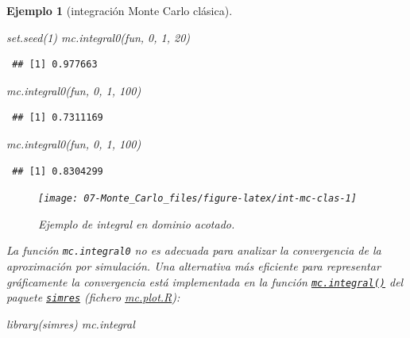 \documentclass[
]{book}
\newenvironment{Shaded}{\begin{snugshade}}{\end{snugshade}}
\newcommand{\DecValTok}[1]{\textcolor[rgb]{0.00,0.00,0.81}{#1}}
\newcommand{\FunctionTok}[1]{\textcolor[rgb]{0.00,0.00,0.00}{#1}}
\newcommand{\NormalTok}[1]{#1}
\theoremstyle{break}
\newtheorem{example}{Ejemplo}[chapter]
\theoremstyle{nonumberplain}
\begin{document}
\begin{example}[integración Monte Carlo clásica]
\begin{Shaded}
\begin{Highlighting}[]
\FunctionTok{set.seed}\NormalTok{(}\DecValTok{1}\NormalTok{)}
\FunctionTok{mc.integral0}\NormalTok{(fun, }\DecValTok{0}\NormalTok{, }\DecValTok{1}\NormalTok{, }\DecValTok{20}\NormalTok{)}
\end{Highlighting}
\end{Shaded}

\begin{verbatim}
 ## [1] 0.977663
\end{verbatim}

\begin{Shaded}
\begin{Highlighting}[]
\FunctionTok{mc.integral0}\NormalTok{(fun, }\DecValTok{0}\NormalTok{, }\DecValTok{1}\NormalTok{, }\DecValTok{100}\NormalTok{)}
\end{Highlighting}
\end{Shaded}

\begin{verbatim}
 ## [1] 0.7311169
\end{verbatim}

\begin{Shaded}
\begin{Highlighting}[]
\FunctionTok{mc.integral0}\NormalTok{(fun, }\DecValTok{0}\NormalTok{, }\DecValTok{1}\NormalTok{, }\DecValTok{100}\NormalTok{)}
\end{Highlighting}
\end{Shaded}

\begin{verbatim}
 ## [1] 0.8304299
\end{verbatim}

\begin{figure}[!htb]

{\centering \texttt{[image: 07-Monte\_Carlo\_files/figure-latex/int-mc-clas-1]} 

}

\caption{Ejemplo de integral en dominio acotado.}\label{fig:int-mc-clas}
\end{figure}

La función \texttt{mc.integral0} no es adecuada para analizar la convergencia de la aproximación por simulación.
Una alternativa más eficiente para representar gráficamente la convergencia está implementada en la función \href{https://rubenfcasal.github.io/simres/reference/mc.integral.html}{\texttt{mc.integral()}} del paquete \href{https://rubenfcasal.github.io/simres}{\texttt{simres}} (fichero \href{R/mc.plot.R}{\emph{mc.plot.R}}):

\begin{Shaded}
\begin{Highlighting}[]
\FunctionTok{library}\NormalTok{(simres)}
\NormalTok{mc.integral}
\end{Highlighting}
\end{Shaded}


\end{example}
\end{document}
